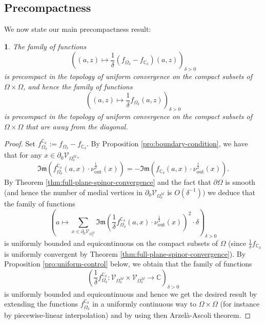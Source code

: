 \documentclass[oneside,english]{amsart}
\numberwithin{equation}{section}
\numberwithin{figure}{section}
\theoremstyle{plain}
\theoremstyle{plain}
\theoremstyle{plain}
\theoremstyle{plain}
\newtheorem{prop}[thm]{\protect\propositionname}
\theoremstyle{plain}
\theoremstyle{definition}
\theoremstyle{remark}
\providecommand{\propositionname}{Proposition}
\begin{document}
\subsection{Precompactness}

We now state our main precompactness result:
\begin{prop}
\label{pro:precompactness}The family of functions 
\[
\left(\left(a,z\right)\mapsto\frac{1}{\delta}\left(f_{\Omega_{\delta}}-f_{\mathbb{C}_{\delta}}\right)\left(a,z\right)\right)_{\delta>0}
\]
is precompact in the topology of uniform convergence on the compact
subsets of $\Omega\times\Omega$, and hence the family of functions
\[
\left(\left(a,z\right)\mapsto\frac{1}{\delta}f_{\Omega_{\delta}}\left(a,z\right)\right)_{\delta>0}
\]
is precompact in the topology of uniform convergence on the compact
subsets of $\Omega\times\Omega$ that are away from the diagonal. \end{prop}
\begin{proof}
Set $f_{\Omega_{\delta}}^{\mathbb{C}_{\delta}}:=f_{\Omega_{\delta}}-f_{\mathbb{C}_{\delta}}$.
By Proposition \ref{pro:boundary-condition}, we have that for any
$x\in\partial_{0}\mathcal{V}_{\Omega_{\delta}^{M}}$, 
\[
\Im\mathfrak{m}\left(f_{\Omega_{\delta}}^{\mathbb{C}_{\delta}}\left(a,x\right)\cdot\nu_{\mathrm{out}}^{\frac{1}{2}}\left(x\right)\right)=-\Im\mathfrak{m}\left(f_{\mathbb{C}_{\delta}}\left(a,x\right)\cdot\nu_{\mathrm{out}}^{\frac{1}{2}}\left(x\right)\right).
\]
By Theorem \ref{thm:full-plane-spinor-convergence} and the fact that
$\partial\Omega$ is smooth (and hence the number of medial vertices
in $\partial_{0}\mathcal{V}_{\Omega_{\delta}^{M}}$ is $O\left(\delta^{-1}\right))$
we deduce that the family of functions
\[
\left(a\mapsto\sum_{x\in\partial_{0}\mathcal{V}_{\Omega_{\delta}^{M}}}\Im\mathfrak{m}\left(\frac{1}{\delta}f_{\Omega_{\delta}}^{\mathbb{C}_{\delta}}\left(a,x\right)\cdot\nu_{\mathrm{out}}^{\frac{1}{2}}\left(x\right)\right)^{2}\cdot\delta\right)_{\delta>0}
\]
is uniformly bounded and equicontinuous on the compact subsets of
$\Omega$ (since $\frac{1}{\delta}f_{\mathbb{C}_{\delta}}$ is uniformly
convergent by Theorem \ref{thm:full-plane-spinor-convergence}). By
Proposition \ref{pro:uniform-control} below, we obtain that the family
of functions 
\[
\left(\frac{1}{\delta}f_{\Omega_{\delta}}^{\mathbb{C}_{\delta}}:\mathcal{V}_{\Omega_{\delta}^{M}}\times\mathcal{V}_{\Omega_{\delta}^{M}}\to\mathbb{C}\right)_{\delta>0}
\]
is uniformly bounded and equicontinuous and hence we get the desired
result by extending the functions $f_{\Omega_{\delta}}^{\mathbb{C}_{\delta}}$
in a uniformly continuous way to $\Omega\times\Omega$ (for instance
by piecewise-linear interpolation) and by using then Arzelà-Ascoli
theorem.\end{proof}
\end{document}
